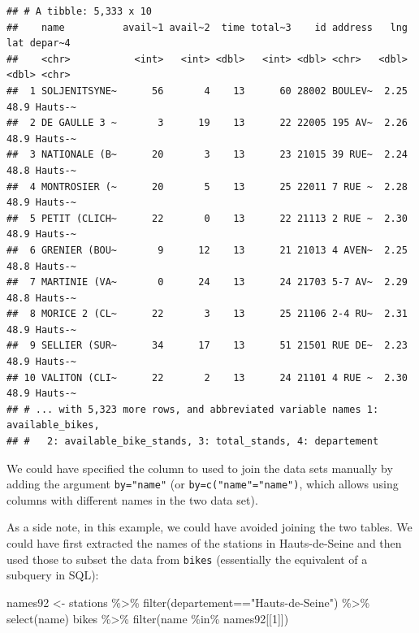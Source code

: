 \documentclass[
]{book}
\newenvironment{Shaded}{\begin{snugshade}}{\end{snugshade}}
\newcommand{\DecValTok}[1]{\textcolor[rgb]{0.00,0.00,0.81}{#1}}
\newcommand{\FunctionTok}[1]{\textcolor[rgb]{0.00,0.00,0.00}{#1}}
\newcommand{\NormalTok}[1]{#1}
\newcommand{\OtherTok}[1]{\textcolor[rgb]{0.56,0.35,0.01}{#1}}
\newcommand{\SpecialCharTok}[1]{\textcolor[rgb]{0.00,0.00,0.00}{#1}}
\newcommand{\StringTok}[1]{\textcolor[rgb]{0.31,0.60,0.02}{#1}}
\begin{document}
\begin{verbatim}
## # A tibble: 5,333 x 10
##    name          avail~1 avail~2  time total~3    id address   lng   lat depar~4
##    <chr>           <int>   <int> <dbl>   <int> <dbl> <chr>   <dbl> <dbl> <chr>  
##  1 SOLJENITSYNE~      56       4    13      60 28002 BOULEV~  2.25  48.9 Hauts-~
##  2 DE GAULLE 3 ~       3      19    13      22 22005 195 AV~  2.26  48.9 Hauts-~
##  3 NATIONALE (B~      20       3    13      23 21015 39 RUE~  2.24  48.8 Hauts-~
##  4 MONTROSIER (~      20       5    13      25 22011 7 RUE ~  2.28  48.9 Hauts-~
##  5 PETIT (CLICH~      22       0    13      22 21113 2 RUE ~  2.30  48.9 Hauts-~
##  6 GRENIER (BOU~       9      12    13      21 21013 4 AVEN~  2.25  48.8 Hauts-~
##  7 MARTINIE (VA~       0      24    13      24 21703 5-7 AV~  2.29  48.8 Hauts-~
##  8 MORICE 2 (CL~      22       3    13      25 21106 2-4 RU~  2.31  48.9 Hauts-~
##  9 SELLIER (SUR~      34      17    13      51 21501 RUE DE~  2.23  48.9 Hauts-~
## 10 VALITON (CLI~      22       2    13      24 21101 4 RUE ~  2.30  48.9 Hauts-~
## # ... with 5,323 more rows, and abbreviated variable names 1: available_bikes,
## #   2: available_bike_stands, 3: total_stands, 4: departement
\end{verbatim}

We could have specified the column to used to join the data sets manually by adding the argument \texttt{by="name"} (or \texttt{by=c("name"="name")}, which allows using columns with different names in the two data set).

As a side note, in this example, we could have avoided joining the two tables. We could have first extracted the names of the stations in Hauts-de-Seine and then used those to subset the data from \texttt{bikes} (essentially the equivalent of a subquery in SQL):

\begin{Shaded}
\begin{Highlighting}[]
\NormalTok{names92 }\OtherTok{\textless{}{-}}\NormalTok{ stations }\SpecialCharTok{\%\textgreater{}\%} \FunctionTok{filter}\NormalTok{(departement}\SpecialCharTok{==}\StringTok{"Hauts{-}de{-}Seine"}\NormalTok{) }\SpecialCharTok{\%\textgreater{}\%}
               \FunctionTok{select}\NormalTok{(name) }
\NormalTok{bikes }\SpecialCharTok{\%\textgreater{}\%} \FunctionTok{filter}\NormalTok{(name }\SpecialCharTok{\%in\%}\NormalTok{ names92[[}\DecValTok{1}\NormalTok{]]) }
\end{Highlighting}
\end{Shaded}
\end{document}
